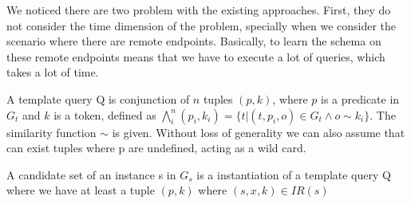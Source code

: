 We noticed there are two problem with the existing approaches. First, they do not consider the time dimension of the problem, specially when we consider the scenario where there are remote endpoints. Basically, to learn the schema on these remote endpoints means that we have to execute a lot of queries, which takes a lot of time. 

\begin{definition}   A template query Q is conjunction of $n$ tuples $(p, k)$, where $p$ is a predicate in $G_t$ and $k$ is a token, defined as $ \bigwedge_{i}^n (p_i, k_i)=\{t | (t,p_i,o) \in G_t  \land o \sim k_i  \}$. The similarity function $\sim$ is given. Without loss of generality we can also assume that can exist tuples where p are undefined, acting as a wild card. 
\end{definition} 
 
\begin{definition}   A candidate set of an instance s in $G_s$ is a instantiation of a template query Q where we have at least a tuple $(p,k)$ where $(s,x,k) \in IR(s)$
\end{definition} 


